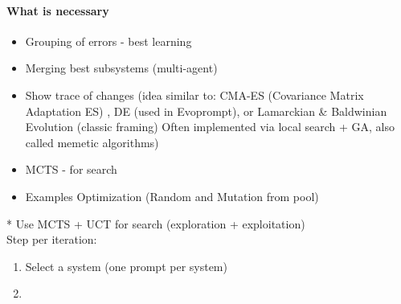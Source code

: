 \documentclass[12pt]{article}
\begin{document}
\paragraph{What is necessary}
\begin{itemize}
  \item Grouping of errors - best learning 
  \item Merging best subsystems (multi-agent)
  \item Show trace of changes (idea similar to: CMA-ES (Covariance Matrix Adaptation ES) , DE (used in Evoprompt), or Lamarckian \& Baldwinian Evolution (classic framing) Often implemented via local search + GA, also called memetic algorithms)
  \item MCTS - for search 
  \item Examples Optimization (Random and Mutation from pool)
\end{itemize}

* Use MCTS + UCT for search (exploration + exploitation) \\
Step per iteration:
\begin{enumerate}
\item Select a system (one prompt per system)
\item 
\end{enumerate}

%   
%     
\end{document}
